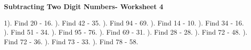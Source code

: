 \documentclass{article}%
\begin{document}
\newline%
\newline%
\pagebreak%
\large%
\begin{center}%
\textbf{Subtracting Two Digit Numbers- Worksheet 4}%
\newline%
\newline%
\newline%
\end{center} \normalsize%
1). Find 20 {-} 16.%
\newline%
\newline%
). Find 42 {-} 35.%
\newline%
\newline%
). Find 94 {-} 69.%
\newline%
\newline%
). Find 14 {-} 10.%
\newline%
\newline%
). Find 34 {-} 16.%
\newline%
\newline%
). Find 51 {-} 34.%
\newline%
\newline%
). Find 95 {-} 76.%
\newline%
\newline%
). Find 69 {-} 31.%
\newline%
\newline%
). Find 28 {-} 28.%
\newline%
\newline%
). Find 72 {-} 48.%
\newline%
\newline%
). Find 72 {-} 36.%
\newline%
\newline%
). Find 73 {-} 33.%
\newline%
\newline%
). Find 78 {-} 58.%
\newline%
\newline%
\end{document}
